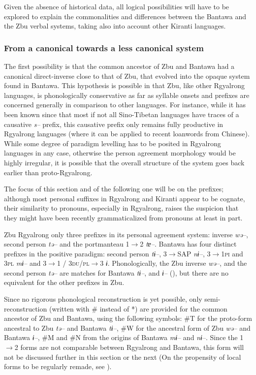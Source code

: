 \documentclass[twoside,a4paper,11pt]{article}
\newcommand{\ipa}[1]{{\phon\textit{#1}}}
\newcommand{\Σ}{\greek{Σ}}
\begin{document}
Given the absence of historical data, all logical possibilities will have to be explored to explain the commonalities and differences between the Bantawa and the Zbu verbal systems, taking also into account other Kiranti languages.




\subsubsection{From a canonical towards a less canonical system}

The first possibility is that the common ancestor of Zbu and Bantawa had a canonical direct-inverse close to that of Zbu, that evolved into the opaque system found in Bantawa. This hypothesis is possible in that Zbu, like other Rgyalrong languages, is   phonologically conservative as far as syllable onsets and prefixes are concerned generally in comparison to other languages. For instance, while it has been known since \citet{conrady1896} that most if not all Sino-Tibetan languages have  traces of a causative \ipa{s--} prefix, this causative prefix only remains fully productive in Rgyalrong languages (where it can be applied to recent loanwords from Chinese). While some degree of paradigm levelling has to be posited in Rgyalrong languages in any case, otherwise the person agreement morphology would be highly irregular, it is possible that the overall structure of the system goes back earlier than proto-Rgyalrong.

The focus of this section and of the following one will be on the prefixes; although most personal suffixes in Rgyalrong and Kiranti appear to be cognate, their similarity to pronouns, especially in Rgyalrong, raises the suspicion that they might have been recently grammaticalized from pronouns at least in part.   

Zbu Rgyalrong only three prefixes in its personal agreement system:   inverse   \ipa{wə--},   second person   \ipa{tə--}  and the portmanteau 1$\rightarrow$2   \ipa{tɐ--}. Bantawa has four distinct prefixes in the positive paradigm:   second person \ipa{tɨ--},   3$\rightarrow$SAP \ipa{nɨ--}, 3$\rightarrow$\textsc{1pi} and \textsc{3pl} \ipa{mɨ--} and 3$\rightarrow$1 / \textsc{3du/pl}$\rightarrow$3 \ipa{ɨ}. Phonologically,  the Zbu inverse  \ipa{wə--}, and the  second person   \ipa{tə--}  are matches for Bantawa \ipa{tɨ--},  and \ipa{ɨ--} (\citealt{jacques12agreement}), but there are no equivalent for the other prefixes in Zbu.


Since no rigorous phonological reconstruction is yet possible, only semi-reconstruction (written with \# instead of *) are provided for the common ancestor of Zbu and Bantawa, using the following symbols: \#T for the proto-form ancestral to Zbu \ipa{tə--} and Bantawa \ipa{tɨ--}, \#W for the ancestral form of Zbu \ipa{wə--} and Bantawa \ipa{ɨ--}, \#M and \#N from the origins of Bantawa \ipa{mɨ--} and \ipa{nɨ--}. Since the 1$\rightarrow$2 forms are not comparable between Rgyalrong and Bantawa, this form will not be discussed further in this section or the next (On the propensity of local forms to be regularly remade, see \citealt{heath98skewing}).
\end{document}
